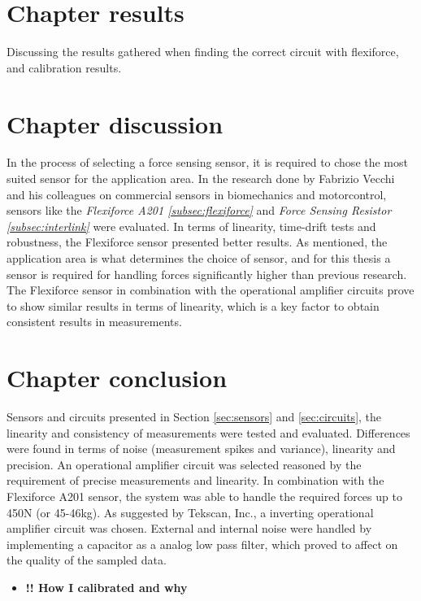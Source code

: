 \section{Chapter results}
\label{sec:chapresults3}
Discussing the results gathered when finding the correct circuit with flexiforce, and calibration results.

\section{Chapter discussion}
In the process of selecting a force sensing sensor, it is required to chose the most suited sensor for the application area. In the research done by Fabrizio Vecchi and his colleagues \citep{vecchi_experimental_2000} on commercial sensors in biomechanics and motorcontrol, sensors like the \textit{Flexiforce A201 \ref{subsec:flexiforce}} and \textit{Force Sensing Resistor \ref{subsec:interlink}} were evaluated. In terms of linearity, time-drift tests and robustness, the Flexiforce sensor presented better results. As mentioned, the application area is what determines the choice of sensor, and for this thesis a sensor is required for handling forces significantly higher than previous research. The Flexiforce sensor in combination with the operational amplifier circuits prove to show similar results in terms of linearity, which is a key factor to obtain consistent results in measurements.

\section{Chapter conclusion}
Sensors and circuits presented in Section \ref{sec:sensors} and \ref{sec:circuits}, the linearity and consistency of measurements were tested and evaluated. Differences were found in terms of noise (measurement spikes and variance), linearity and precision. An operational amplifier circuit was selected reasoned by the requirement of precise measurements and linearity. In combination with the Flexiforce A201 sensor, the system was able to handle the required forces up to 450\si{\newton} (or 45-46\si{\kilogram}). As suggested by Tekscan, Inc., a inverting operational amplifier circuit was chosen.
External and internal noise were handled by implementing a capacitor as a analog low pass filter, which proved to affect on the quality of the sampled data.
\begin{itemize}
    \item \textbf{!! How I calibrated and why}
\end{itemize}
